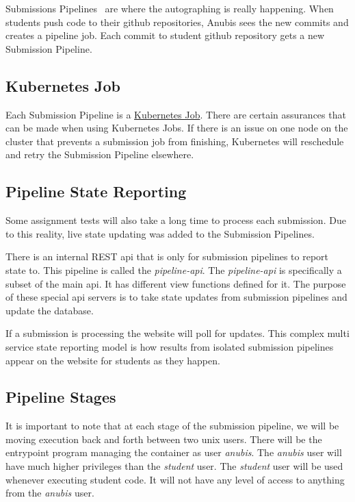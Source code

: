 Submissions Pipelines~ are where the autographing is really happening.
When students push code to their github repositories, Anubis sees the new
commits and creates a pipeline job.
Each commit to student github repository gets a new Submission Pipeline.

\subsection{Kubernetes Job}\label{subsec:kubernetes-job}

Each Submission Pipeline is a \href{https://kubernetes.io/docs/concepts/workloads/controllers/job/}{Kubernetes Job}.
There are certain assurances that can be made when using Kubernetes Jobs.
If there is an issue on one node on the cluster that prevents a submission job from finishing,
Kubernetes will reschedule and retry the Submission Pipeline elsewhere.

\subsection{Pipeline State Reporting}\label{subsec:pipeline-state-reporting}

Some assignment tests will also take a long time to process each submission.
Due to this reality, live state updating was added to the Submission Pipelines.

There is an internal REST api that is only for submission pipelines to report state to.
This pipeline is called the \textit{pipeline-api}.
The \textit{pipeline-api} is specifically a subset of the main api.
It has different view functions defined for it.
The purpose of these special api servers is to take state updates from submission
pipelines and update the database.

If a submission is processing the website will poll for updates.
This complex multi service state reporting model is how results from isolated
submission pipelines appear on the website for students as they happen.

\subsection{Pipeline Stages}\label{subsec:pipeline-stages}

It is important to note that at each stage of the submission pipeline,
we will be moving execution back and forth between two unix users.
There will be the entrypoint program managing the container as user \textit{anubis}.
The \textit{anubis} user will have much higher privileges than the \textit{student} user.
The \textit{student} user will be used whenever executing student code.
It will not have any level of access to anything from the \textit{anubis} user.

